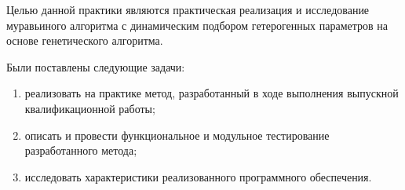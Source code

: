 
Целью данной практики являются практическая реализация и исследование муравьиного алгоритма с динамическим подбором гетерогенных параметров на основе генетического алгоритма.

Были поставлены следующие задачи:

\begin{enumerate}
	\item реализовать на практике метод, разработанный в ходе выполнения выпускной квалификационной работы;
	\item описать и провести функциональное и модульное тестирование разработанного метода;
	\item исследовать характеристики реализованного программного обеспечения.
\end{enumerate}
\clearpage

